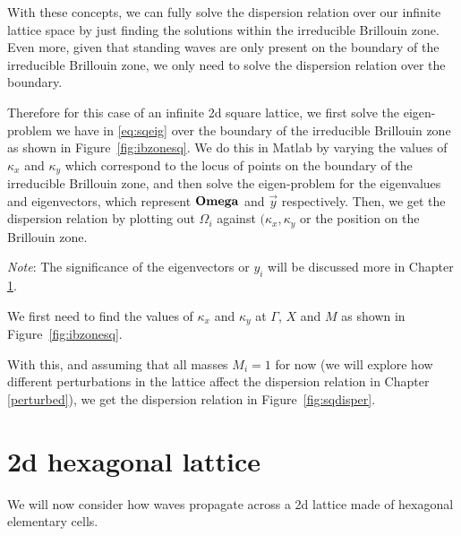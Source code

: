 With these concepts, we can fully solve the dispersion relation over our
infinite lattice space by just finding the solutions within the irreducible
Brillouin zone. Even more, given that standing waves are only present on the
boundary of the irreducible Brillouin zone, we only need to solve the
dispersion relation over the boundary.

Therefore for this case of an infinite 2d square lattice, we first solve the
eigen-problem we have in \eqref{eq:sqeig} over the boundary of the irreducible
Brillouin zone as shown in Figure~\ref{fig:ibzonesq}. We do this in Matlab by
varying the values of $\kappa_{x}$ and $\kappa_{y}$ which correspond to the
locus of points on the boundary of the irreducible Brillouin zone, and then
solve the eigen-problem for the eigenvalues and eigenvectors, which represent
$\mathbf{Omega}$ and $\vec{y}$ respectively. Then, we get the dispersion relation
by plotting out $\Omega_i$ against $(\kappa_x,\kappa_y$ or the position on the
Brillouin zone.

\textit{Note}: The significance of the eigenvectors or $y_i$ will be discussed
more in Chapter \ref{}.

We first need to find the values of $\kappa_{x}$ and $\kappa_{y}$ at $\Gamma$,
$X$ and $M$ as shown in Figure~\ref{fig:ibzonesq}.

With this, and assuming that all masses $M_i=1$ for now (we will explore how
different perturbations in the lattice affect the dispersion relation in
Chapter \ref{perturbed}), we get the dispersion relation in
Figure~\ref{fig:sqdisper}. 

\section{2d hexagonal lattice}
We will now consider how waves propagate across a 2d lattice made of hexagonal
elementary cells. 


